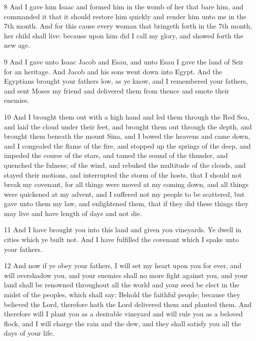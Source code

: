 \par 8 And I gave him Isaac and formed him in the womb of her that bare him, and commanded it that it should restore him quickly and render him unto me in the 7th month. And for this cause every woman that bringeth forth in the 7th month, her child shall live: because upon him did I call my glory, and showed forth the new age. 

\par 9 And I gave unto Isaac Jacob and Esau, and unto Esau I gave the land of Seir for an heritage. And Jacob and his sons went down into Egypt. And the Egyptians brought your fathers low, as ye know, and I remembered your fathers, and sent Moses my friend and delivered them from thence and smote their enemies.

\par 10 And I brought them out with a high hand and led them through the Red Sea, and laid the cloud under their feet, and brought them out through the depth, and brought them beneath the mount Sina, and I bowed the heavens and came down, and I congealed the flame of the fire, and stopped up the springs of the deep, and impeded the course of the stars, and tamed the sound of the thunder, and quenched the fulness; of the wind, and rebuked the multitude of the clouds, and stayed their motions, and interrupted the storm of the hosts, that I should not break my covenant, for all things were moved at my coming down, and all things were quickened at my advent, and I suffered not my people to be scattered, but gave unto them my law, and enlightened them, that if they did these things they may live and have length of days and not die. 

\par 11 And I have brought you into this land and given you vineyards. Ye dwell in cities which ye built not. And I have fulfilled the covenant which I spake unto your fathers.

\par 12 And now if ye obey your fathers, I will set my heart upon you for ever, and will overshadow you, and your enemies shall no more fight against you, and your land shall be renowned throughout all the world and your seed be elect in the midst of the peoples, which shall say: Behold the faithful people; because they believed the Lord, therefore hath the Lord delivered them and planted them. And therefore will I plant you as a desirable vineyard and will rule you as a beloved flock, and I will charge the rain and the dew, and they shall satisfy you all the days of your life. 

